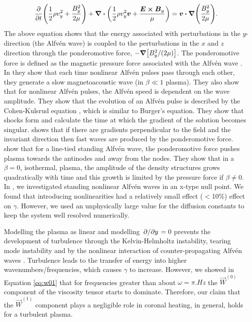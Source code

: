 \begin{equation}
    \pdv{}{t}\qty(\frac{1}{2}\rho v_y^2 + \frac{B_y^2}{2\mu}) + \div(\frac{1}{2}\rho v_y^2 \vec{v} + \frac{\vec{E}\cross\vec{B}_y}{\mu})=\vec{v}\vdot\grad(\frac{B_y^2}{2\mu}).
\end{equation}
The above equation shows that the energy associated with perturbations in the $y$-direction (the Alfv\'en wave) is coupled to the perturbations in the $x$ and $z$ direction through the ponderomotive force, $-\grad[B_y^2/(2\mu)]$. The ponderomotive force is defined as the magnetic pressure force associated with the Alfv\'en wave \citep{Verwichte1999}. In \citet{Verwichte1999} they show that each time nonlinear Alfv\'en pulses pass through each other, they generate a slow magnetoacoustic wave (in $\beta\ll1$ plasma). They also show that for nonlinear Alfv\'en pulses, the Alfv\'en speed is dependent on the wave amplitude. They show that the evolution of an Alfv\'en pulse is described by the Cohen-Kulsrud equation \citep{Cohen1974}, which is similar to Burger's equation. They show that shocks form and calculate the time at which the gradient of the solution becomes singular. \citet{Thurgood2013a,Thurgood2013b} shows that if there are gradients perpendicular to the field and the invariant direction then fast waves are produced by the ponderomotive force. \citet{Terradas2006} show that for a line-tied standing Alfv\'en wave, the ponderomotive force pushes plasma towards the antinodes and away from the nodes. They show that in a $\beta=0$, isothermal, plasma, the amplitude of the density structures grows quadratically with time and this growth is limited by the pressure force if $\beta\ne0$. In \citet{Prokopyszyn2019a}, we investigated standing nonlinear Alfv\'en waves in an x-type null point. We found that introducing nonlinearities had a relatively small effect ($<$10\%) effect on $\gamma$. However, we used an unphysically large value for the diffusion constants to keep the system well resolved numerically.

Modelling the plasma as linear and modelling $\pdv*{}{y}=0$ prevents the development of turbulence through the Kelvin-Helmholtz instability, tearing mode instability and by the nonlinear interaction of counter-propagating Alfv\'en waves \citep{Hollweg1986a,vanBallegooijen2011,Shoda2019}. Turbulence leads to the transfer of energy into higher wavenumbers/frequencies, which causes $\gamma$ to increase. However, we showed in Equation \eqref{eq:w01} that for frequencies greater than about $\omega=\pi\si{.Hz}$ the $\vec{W}^{(0)}$ component of the viscosity tensor starts to dominate. Therefore, our claim that the $\vec{W}^{(1)}$ component plays a negligible role in coronal heating, in general, holds for a turbulent plasma.

